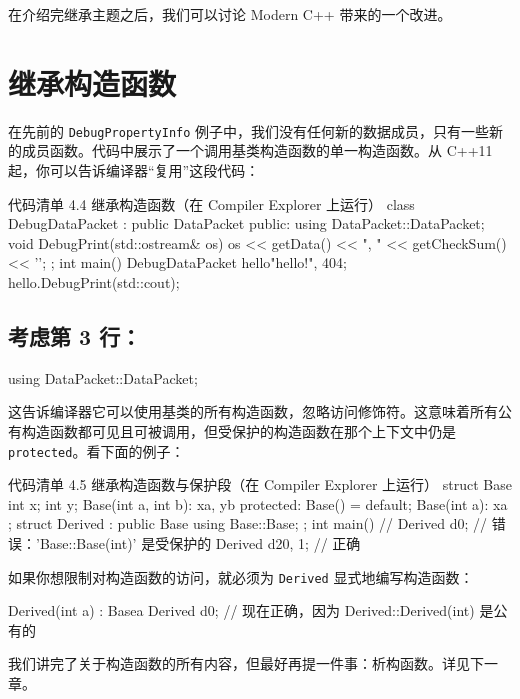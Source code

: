 在介绍完继承主题之后，我们可以讨论 Modern C++ 带来的一个改进。

\section{继承构造函数}

在先前的 \texttt{DebugPropertyInfo} 例子中，我们没有任何新的数据成员，只有一些新的成员函数。代码中展示了一个调用基类构造函数的单一构造函数。从 C++11 起，你可以告诉编译器“复用”这段代码：

\begin{codeboxt}[cpp]{代码清单 4.4 继承构造函数（在 Compiler Explorer 上运行）}
class DebugDataPacket : public DataPacket {
public:
using DataPacket::DataPacket;
void DebugPrint(std::ostream& os) {
os << getData() << ", " << getCheckSum() << '\n';
}
};
int main() {
DebugDataPacket hello{"hello!", 404};
hello.DebugPrint(std::cout);
}
\end{codeboxt}

\subsection{考虑第 3 行：}

\begin{codebox}[cpp]
using DataPacket::DataPacket;
\end{codebox}

这告诉编译器它可以使用基类的所有构造函数，忽略访问修饰符。这意味着所有公有构造函数都可见且可被调用，但受保护的构造函数在那个上下文中仍是 \texttt{protected}。看下面的例子：

\begin{codeboxt}[cpp]{代码清单 4.5 继承构造函数与保护段（在 Compiler Explorer 上运行）}
struct Base {
int x{};
int y{};
Base(int a, int b): x{a}, y{b} { }
protected:
Base() = default;
Base(int a): x{a} { }
};
struct Derived : public Base {
using Base::Base;
};
int main() {
// Derived d{0};
// 错误：'Base::Base(int)' 是受保护的
Derived d2{0, 1}; // 正确
}
\end{codeboxt}

如果你想限制对构造函数的访问，就必须为 \texttt{Derived} 显式地编写构造函数：

\begin{codebox}[cpp]
Derived(int a) : Base{a} { }
Derived d{0}; // 现在正确，因为 Derived::Derived(int) 是公有的
\end{codebox}

我们讲完了关于构造函数的所有内容，但最好再提一件事：析构函数。详见下一章。
